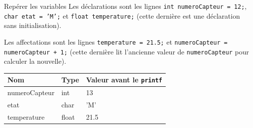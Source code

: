 \begin{UPSTIprofOnlyEnv}
    \begin{UPSTIcorrectionP}{Repérer les variables}
        Les déclarations sont les lignes \texttt{int numeroCapteur = 12;}, \texttt{char etat = 'M';} et \texttt{float temperature;} (cette dernière est une déclaration sans initialisation).

        Les affectations sont les lignes \texttt{temperature = 21.5;} et \texttt{numeroCapteur = numeroCapteur + 1;} (cette dernière lit l'ancienne valeur de \texttt{numeroCapteur} pour calculer la nouvelle).

        \begin{center}
            \begin{tabular}{|l|l|l|}
                \hline
                \textbf{Nom}      & \textbf{Type}   & \textbf{Valeur avant le \texttt{printf}} \\
                \hline
                numeroCapteur     & int             & 13                                       \\
                \hline
                etat              & char            & 'M'                                      \\
                \hline
                temperature       & float           & 21.5                                     \\
                \hline
            \end{tabular}
        \end{center}
    \end{UPSTIcorrectionP}
\end{UPSTIprofOnlyEnv}


